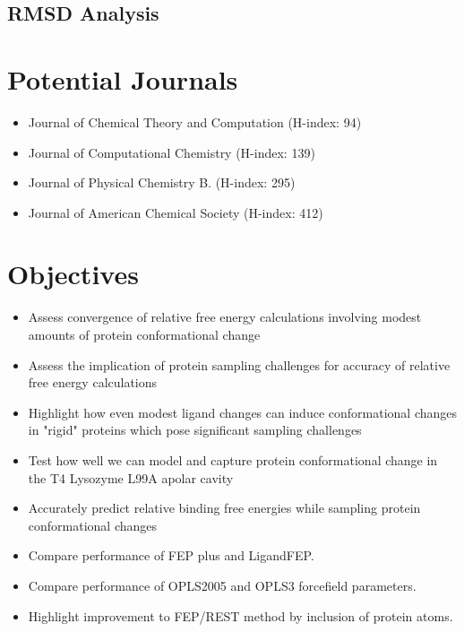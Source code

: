 \documentclass[journal=jctcce,manuscript=article]{achemso}
\begin{document}
\subsection*{RMSD Analysis}



\pagebreak

\section{Potential Journals}
\begin{itemize}
   \item Journal of Chemical Theory and Computation (H-index: 94)
   \item Journal of Computational Chemistry (H-index: 139)
   \item Journal of Physical Chemistry B. (H-index: 295)
   \item Journal of American Chemical Society (H-index: 412)
\end{itemize}

\section{Objectives}
\begin{itemize}
   \item Assess convergence of relative free energy calculations involving modest amounts of protein conformational change
   \item Assess the implication of protein sampling challenges for accuracy of relative free energy calculations
   \item Highlight how even modest ligand changes can induce conformational changes in "rigid" proteins which pose significant sampling challenges
   \item Test how well we can model and capture protein conformational change in the T4 Lysozyme L99A apolar cavity
   \item Accurately predict relative binding free energies while sampling protein conformational changes
   \item Compare performance of FEP plus \cite{FEPplus} and LigandFEP.
   \item Compare performance of OPLS2005 and OPLS3 forcefield parameters.
   \item Highlight improvement to FEP/REST \cite{REST2} method by inclusion of protein atoms.
\end{itemize}
\end{document}
